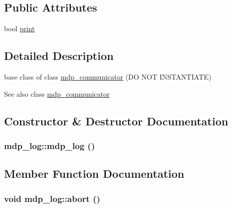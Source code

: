 \subsection*{Public Attributes}
\begin{DoxyCompactItemize}
\item 
bool \hyperlink{classmdp__log_a1330daef61266763f9a736300a1eac49}{print}
\end{DoxyCompactItemize}


\subsection{Detailed Description}
base class of class \hyperlink{classmdp__communicator}{mdp\_\-communicator} (DO NOT INSTANTIATE) \begin{DoxySeeAlso}{See also}
class \hyperlink{classmdp__communicator}{mdp\_\-communicator} 
\end{DoxySeeAlso}


\subsection{Constructor \& Destructor Documentation}
\hypertarget{classmdp__log_a76a398101c2618249099be4fda3ce26c}{
\subsubsection[{mdp\_\-log}]{\setlength{\rightskip}{0pt plus 5cm}mdp\_\-log::mdp\_\-log ()}}
\label{classmdp__log_a76a398101c2618249099be4fda3ce26c}


\subsection{Member Function Documentation}
\hypertarget{classmdp__log_a0e85794c9c7fdaf944eb70d1f2c0ecc5}{
\subsubsection[{abort}]{\setlength{\rightskip}{0pt plus 5cm}void mdp\_\-log::abort ()}}
\label{classmdp__log_a0e85794c9c7fdaf944eb70d1f2c0ecc5}


